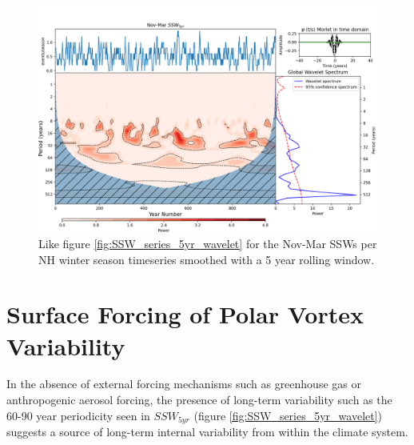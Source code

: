 \begin{figure}[h!]
\begin{center}
\noindent\includegraphics[width = 0.8\linewidth]{Figures/Figures-origins/SSW_wavelet_5_yr_NDJFM.png}
\caption{Like figure \ref{fig:SSW_series_5yr_wavelet} for the Nov-Mar SSWs per NH winter season timeseries smoothed with a 5 year rolling window.}
\label{fig:SSW_series_5yr_NDJFM_wavelet}
\end{center}
\end{figure}



\section{Surface Forcing of Polar Vortex Variability}
In the absence of external forcing mechanisms such as greenhouse gas or anthropogenic aerosol forcing, the presence of long-term variability such as the 60-90 year periodicity seen in $SSW_{5yr}$ (figure \ref{fig:SSW_series_5yr_wavelet}) suggests a source of long-term internal variability from within the climate system. 

